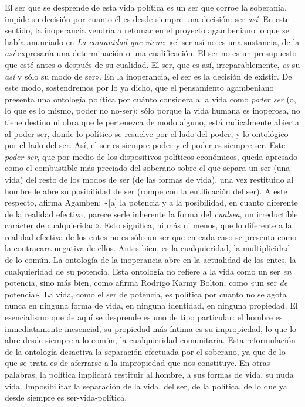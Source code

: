El ser que se desprende de esta vida política es un ser que corroe la soberanía, impide su decisión por cuanto él es desde siempre una decisión: ser-\emph{así}. En este sentido, la inoperancia vendría a retomar en el proyecto agambeniano lo que se había anunciado en \emph{La comunidad que viene}: «el ser-así no es una sustancia, de la \emph{así }expresaría una determinación o una cualificación. El ser no es un presupuesto que esté antes o después de su cualidad. El ser, que es así, irreparablemente, \emph{es }su \emph{así} y sólo su modo de ser». En la inoperancia, el ser es la decisión de existir. De este modo, sostendremos por lo ya dicho, que el pensamiento agambeniano presenta una ontología política por cuánto considera a la vida como \emph{poder ser} (o, lo que es lo mismo, poder no no-ser): sólo porque la vida humana es inoperosa, no tiene destino ni obra que le pertenezca de modo alguno, está radicalmente abierta al poder ser, donde lo político se resuelve por el lado del poder, y lo ontológico por el lado del ser. Así, el ser es siempre poder y el poder es siempre ser. Este \emph{poder-ser}, que por medio de los dispositivos políticos-económicos, queda apresado como el combustible más preciado del soberano sobre el que separa un ser (una vida) del resto de los modos de ser (de las formas de vida), una vez restituido al hombre le abre su posibilidad de ser (rompe con la entificación del ser). A este respecto, afirma Agamben: «{[}a{]} la potencia y a la posibilidad, en cuanto diferente de la realidad efectiva, parece serle inherente la forma del \emph{cualsea}, un irreductible carácter de cualquieridad». Esto significa, ni más ni menos, que lo diferente a la realidad efectiva de los entes no es sólo un ser que en cada caso se presenta como la contracara negativa de ellos. Antes bien, es la cualquieridad, la multiplicidad de lo común. La ontología de la inoperancia abre en la actualidad de los entes, la cualquieridad de su potencia. Esta ontología no refiere a la vida como un ser \emph{en }potencia, sino más bien, como afirma Rodrigo Karmy Bolton, como «un ser \emph{de }potencia». La vida, como el ser de potencia, es política por cuanto no se agota nunca en ninguna forma de vida, en ninguna identidad, en ninguna propiedad. El esencialismo que de aquí se desprende es uno de tipo particular: el hombre es inmediatamente inesencial, su propiedad más íntima es su impropiedad, lo que lo abre desde siempre a lo común, la cualquieridad comunitaria. Esta reformulación de la ontología desactiva la separación efectuada por el soberano, ya que de lo que se trata es de aferrarse a la impropiedad que nos constituye. En otras palabras, la política implicará restituir al hombre, a sus formas de vida, su nuda vida. Imposibilitar la separación de la vida, del ser, de la política, de lo que ya desde siempre es ser-vida-política.

